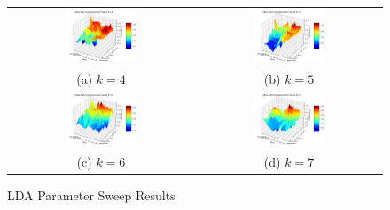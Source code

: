 \documentclass{nws}
\begin{document}
\begin{figure}[h!]
  \centering
  \begin{tabular}{cc}
    \includegraphics[width=0.40\textwidth]{Figures/Coherence_Surface_k=4} &
    \includegraphics[width=0.40\textwidth]{Figures/Coherence_Surface_k=5} \\
  (a) $k=4$ & (b) $k=5$ \\[6pt]
    \includegraphics[width=0.40\textwidth]{Figures/Coherence_Surface_k=6} &
    \includegraphics[width=0.40\textwidth]{Figures/Coherence_Surface_k=7} \\
  (c) $k=6$ & (d) $k=7$ \\[6pt]
  \end{tabular}
  \caption[LDA Parameter Sweep Results]{LDA Parameter Sweep Results}
  \label{fig:lda_param_sweep}
\end{figure}
\end{document}
